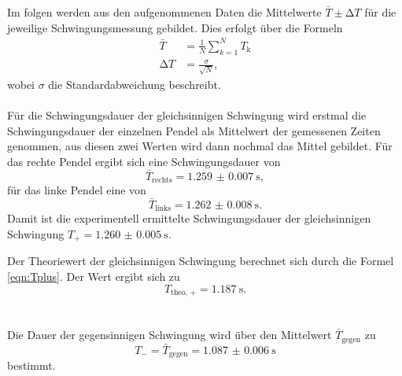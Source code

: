   \noindent Im folgen werden aus den aufgenommenen Daten die Mittelwerte $\bar{T} \pm \increment T$ für die jeweilige Schwingungsmessung gebildet. 
  Dies erfolgt über die Formeln
  \begin{align}  
    \bar{T} &= \frac{1}{N} \sum_{k=1}^{N} T_{\text{k}} \label{eqn:mittel}\\
    \increment T &= \frac{\sigma}{\sqrt{N}} , \label{eqn:fehlermittel} 
  \end{align}
  wobei $\sigma$ die Standardabweichung beschreibt. \\ \\

  \noindent Für die Schwingungsdauer der gleichsinnigen Schwingung wird erstmal die Schwingungsdauer der einzelnen Pendel als Mittelwert der gemessenen Zeiten
  genommen, aus diesen zwei Werten wird dann nochmal das Mittel gebildet. Für das rechte Pendel ergibt sich eine Schwingungsdauer von 
  \begin{equation*}
    \bar{T}_{\text{rechts}} = \SI{1.259(7)}{\second}, 
  \end{equation*}
  für das linke Pendel eine von 
  \begin{equation*}
    \bar{T}_{\text{links}} = \SI{1.262(8)}{\second}. 
  \end{equation*}
  Damit ist die experimentell ermittelte Schwingungsdauer der gleichsinnigen Schwingung $ T_{+} = \SI{1.260(5)}{\second}$. 
  
  \noindent Der Theoriewert der gleichsinnigen Schwingung berechnet sich durch die Formel \eqref{eqn:Tplus}. Der Wert ergibt sich zu 
  \begin{equation*}
    T_{\text{theo, +}} = \SI{1.187}{\second}.
  \end{equation*} \\ \\

  \noindent Die Dauer der gegensinnigen Schwingung wird über den Mittelwert $\bar{T}_{\text{gegen}}$ zu 
  \begin{equation*}
    T_{-} = \bar{T}_{\text{gegen}} = \SI{1.087(6)}{\second}
  \end{equation*} 
  bestimmt.

